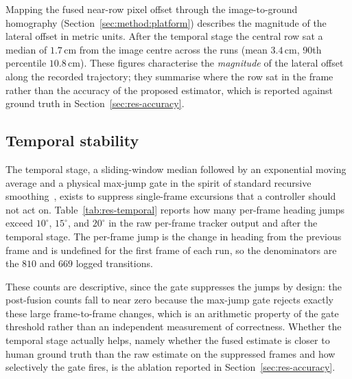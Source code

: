 Mapping the fused near-row pixel offset through the image-to-ground homography
(Section~\ref{sec:method:platform}) describes the magnitude of the lateral offset
in metric units. After the temporal stage the central row sat a median of
$1.7$\,cm from the image centre across the runs (mean $3.4$\,cm, 90th percentile
$10.8$\,cm). These figures characterise the \emph{magnitude} of the lateral offset
along the recorded trajectory; they summarise where the row sat in the frame rather
than the accuracy of the proposed estimator, which is reported against ground truth
in Section~\ref{sec:res-accuracy}.

\subsection{Temporal stability}
\label{sec:res-temporal}

The temporal stage, a sliding-window median followed by an exponential moving
average and a physical max-jump gate in the spirit of standard recursive
smoothing~\cite{kalman1960}, exists to suppress single-frame excursions that a
controller should not act on. Table~\ref{tab:res-temporal} reports how many
per-frame heading jumps exceed $10^\circ$, $15^\circ$, and $20^\circ$ in the raw
per-frame tracker output and after the temporal stage. The per-frame jump is the
change in heading from the previous frame and is undefined for the first frame of
each run, so the denominators are the $810$ and $669$ logged transitions.

These counts are descriptive, since the gate suppresses the jumps by design: the
post-fusion counts fall to near zero because the max-jump gate rejects exactly
these large frame-to-frame changes, which is an arithmetic property of the gate
threshold rather than an independent measurement of correctness. Whether the
temporal stage actually helps, namely whether the fused estimate is closer to
human ground truth than the raw estimate on the suppressed frames and how
selectively the gate fires, is the ablation reported in
Section~\ref{sec:res-accuracy}.


